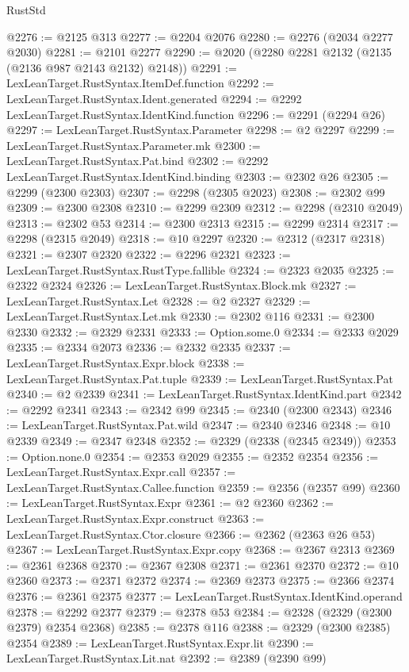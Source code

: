 \begin{lexlean}{RustStd}
\begin{coremodule}
{\begin{coremodule}
{{{{{{{{{{{{{{{{{{{{{{{{{{{{{{{{{{{{{@2276 := @2125 @313
@2277 := @2204 @2076
@2280 := @2276 (@2034 @2277 @2030)
@2281 := @2101 @2277
@2290 := @2020 (@2280 @2281 @2132 (@2135 (@2136 @987 @2143 @2132) @2148))
@2291 := LexLeanTarget.RustSyntax.ItemDef.function
@2292 := LexLeanTarget.RustSyntax.Ident.generated
@2294 := @2292 LexLeanTarget.RustSyntax.IdentKind.function
@2296 := @2291 (@2294 @26)
@2297 := LexLeanTarget.RustSyntax.Parameter
@2298 := @2 @2297
@2299 := LexLeanTarget.RustSyntax.Parameter.mk
@2300 := LexLeanTarget.RustSyntax.Pat.bind
@2302 := @2292 LexLeanTarget.RustSyntax.IdentKind.binding
@2303 := @2302 @26
@2305 := @2299 (@2300 @2303)
@2307 := @2298 (@2305 @2023)
@2308 := @2302 @99
@2309 := @2300 @2308
@2310 := @2299 @2309
@2312 := @2298 (@2310 @2049)
@2313 := @2302 @53
@2314 := @2300 @2313
@2315 := @2299 @2314
@2317 := @2298 (@2315 @2049)
@2318 := @10 @2297
@2320 := @2312 (@2317 @2318)
@2321 := @2307 @2320
@2322 := @2296 @2321
@2323 := LexLeanTarget.RustSyntax.RustType.fallible
@2324 := @2323 @2035
@2325 := @2322 @2324
@2326 := LexLeanTarget.RustSyntax.Block.mk
@2327 := LexLeanTarget.RustSyntax.Let
@2328 := @2 @2327
@2329 := LexLeanTarget.RustSyntax.Let.mk
@2330 := @2302 @116
@2331 := @2300 @2330
@2332 := @2329 @2331
@2333 := Option.some.{0}
@2334 := @2333 @2029
@2335 := @2334 @2073
@2336 := @2332 @2335
@2337 := LexLeanTarget.RustSyntax.Expr.block
@2338 := LexLeanTarget.RustSyntax.Pat.tuple
@2339 := LexLeanTarget.RustSyntax.Pat
@2340 := @2 @2339
@2341 := LexLeanTarget.RustSyntax.IdentKind.part
@2342 := @2292 @2341
@2343 := @2342 @99
@2345 := @2340 (@2300 @2343)
@2346 := LexLeanTarget.RustSyntax.Pat.wild
@2347 := @2340 @2346
@2348 := @10 @2339
@2349 := @2347 @2348
@2352 := @2329 (@2338 (@2345 @2349))
@2353 := Option.none.{0}
@2354 := @2353 @2029
@2355 := @2352 @2354
@2356 := LexLeanTarget.RustSyntax.Expr.call
@2357 := LexLeanTarget.RustSyntax.Callee.function
@2359 := @2356 (@2357 @99)
@2360 := LexLeanTarget.RustSyntax.Expr
@2361 := @2 @2360
@2362 := LexLeanTarget.RustSyntax.Expr.construct
@2363 := LexLeanTarget.RustSyntax.Ctor.closure
@2366 := @2362 (@2363 @26 @53)
@2367 := LexLeanTarget.RustSyntax.Expr.copy
@2368 := @2367 @2313
@2369 := @2361 @2368
@2370 := @2367 @2308
@2371 := @2361 @2370
@2372 := @10 @2360
@2373 := @2371 @2372
@2374 := @2369 @2373
@2375 := @2366 @2374
@2376 := @2361 @2375
@2377 := LexLeanTarget.RustSyntax.IdentKind.operand
@2378 := @2292 @2377
@2379 := @2378 @53
@2384 := @2328 (@2329 (@2300 @2379) @2354 @2368)
@2385 := @2378 @116
@2388 := @2329 (@2300 @2385) @2354
@2389 := LexLeanTarget.RustSyntax.Expr.lit
@2390 := LexLeanTarget.RustSyntax.Lit.nat
@2392 := @2389 (@2390 @99)
}}}}}}}}}}}}}}}}}}}}}}}}}}}}}}}}}}}}}
\end{coremodule}}
\end{coremodule}
\end{lexlean}
